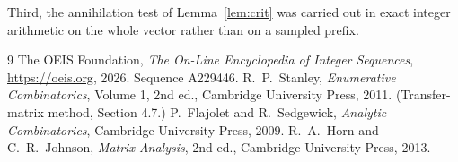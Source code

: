 \documentclass[11pt,a4paper]{article}
\theoremstyle{plain}
\theoremstyle{definition}
\begin{document}
Third, the annihilation test of Lemma~\ref{lem:crit} was carried out in exact integer
arithmetic on the whole vector rather than on a sampled prefix.

\begin{thebibliography}{9}
 The OEIS Foundation, \emph{The On-Line Encyclopedia of Integer
Sequences}, \url{https://oeis.org}, 2026. Sequence A229446.
 R.~P.~Stanley, \emph{Enumerative Combinatorics}, Volume 1, 2nd ed.,
Cambridge University Press, 2011. (Transfer-matrix method, Section 4.7.)
 P.~Flajolet and R.~Sedgewick, \emph{Analytic Combinatorics}, Cambridge
University Press, 2009.
 R.~A.~Horn and C.~R.~Johnson, \emph{Matrix Analysis}, 2nd ed., Cambridge
University Press, 2013.
\end{thebibliography}
\end{document}

